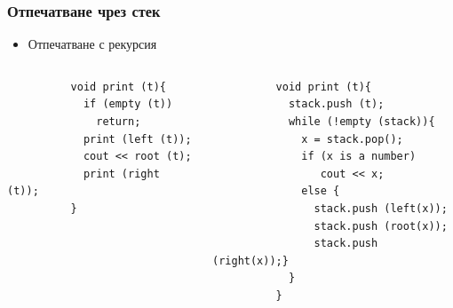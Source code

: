 \documentclass{beamer}
\begin{document}
\begin{frame}[fragile]
\frametitle{Отпечатване чрез стек}

\begin{itemize}
  \item Отпечатване с рекурсия
\end{itemize}


\begin{columns}[t]
  \begin{column}{0.4\textwidth}
      \begin{flushleft}
        \begin{lstlisting}
          void print (t){
            if (empty (t))
              return;
            print (left (t));
            cout << root (t);
            print (right (t));
          }
        \end{lstlisting}
      \end{flushleft}

  \end{column}
  \begin{column}{0.6\textwidth}

      \begin{flushleft}
        \begin{lstlisting}
          void print (t){
            stack.push (t);
            while (!empty (stack)){
              x = stack.pop();
              if (x is a number)
                 cout << x;
              else {
                stack.push (left(x));
                stack.push (root(x));
                stack.push (right(x));}
            }
          }
        \end{lstlisting}
      \end{flushleft}

  \end{column}
\end{columns}




\end{frame}
\end{document}
